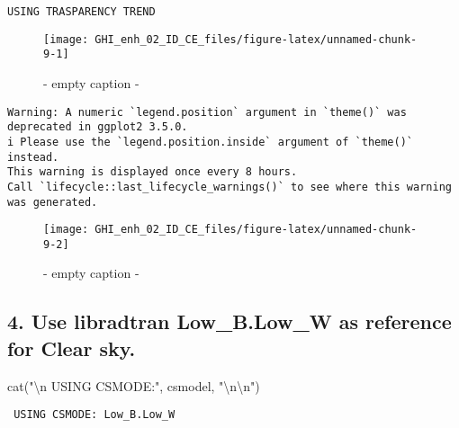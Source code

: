 \documentclass[
  10pt,
  a4paper,oneside]{article}
\newenvironment{Shaded}{\begin{snugshade}}{\end{snugshade}}
\newcommand{\FunctionTok}[1]{\textcolor[rgb]{0.00,0.00,0.00}{#1}}
\newcommand{\NormalTok}[1]{#1}
\newcommand{\SpecialCharTok}[1]{\textcolor[rgb]{0.00,0.00,0.00}{#1}}
\newcommand{\StringTok}[1]{\textcolor[rgb]{0.31,0.60,0.02}{#1}}
\begin{document}
\begin{verbatim}
USING TRASPARENCY TREND
\end{verbatim}

\begin{figure}[H]

{\centering \texttt{[image: GHI\_enh\_02\_ID\_CE\_files/figure-latex/unnamed-chunk-9-1]} 

}

\caption{ - empty caption - }\label{fig:unnamed-chunk-9-1}
\end{figure}

\begin{verbatim}
Warning: A numeric `legend.position` argument in `theme()` was deprecated in ggplot2 3.5.0.
i Please use the `legend.position.inside` argument of `theme()` instead.
This warning is displayed once every 8 hours.
Call `lifecycle::last_lifecycle_warnings()` to see where this warning was generated.
\end{verbatim}

\begin{figure}[H]

{\centering \texttt{[image: GHI\_enh\_02\_ID\_CE\_files/figure-latex/unnamed-chunk-9-2]} 

}

\caption{ - empty caption - }\label{fig:unnamed-chunk-9-2}
\end{figure}

\hypertarget{use-libradtran-low_b.low_w-as-reference-for-clear-sky.}{%
\subsection{\texorpdfstring{4. Use libradtran \textbf{Low\_B.Low\_W} as reference for Clear sky.}{4. Use libradtran Low\_B.Low\_W as reference for Clear sky.}}\label{use-libradtran-low_b.low_w-as-reference-for-clear-sky.}}

\begin{Shaded}
\begin{Highlighting}[]
\FunctionTok{cat}\NormalTok{(}\StringTok{"}\SpecialCharTok{\textbackslash{}n}\StringTok{ USING CSMODE:"}\NormalTok{,    csmodel,     }\StringTok{"}\SpecialCharTok{\textbackslash{}n\textbackslash{}n}\StringTok{"}\NormalTok{)}
\end{Highlighting}
\end{Shaded}

\begin{verbatim}
 USING CSMODE: Low_B.Low_W 
\end{verbatim}
\end{document}
